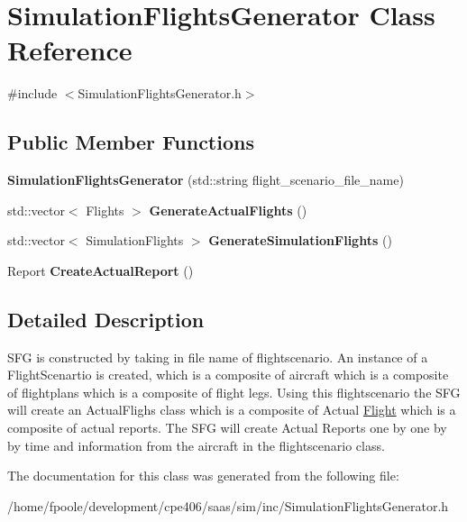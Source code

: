 \hypertarget{class_simulation_flights_generator}{}\section{Simulation\+Flights\+Generator Class Reference}
\label{class_simulation_flights_generator}


{\ttfamily \#include $<$Simulation\+Flights\+Generator.\+h$>$}

\subsection*{Public Member Functions}
\begin{DoxyCompactItemize}
\item 
\hypertarget{class_simulation_flights_generator_a16b4aac72f151322f19a2fa4e6551270}{}{\bfseries Simulation\+Flights\+Generator} (std\+::string flight\+\_\+scenario\+\_\+file\+\_\+name)\label{class_simulation_flights_generator_a16b4aac72f151322f19a2fa4e6551270}

\item 
\hypertarget{class_simulation_flights_generator_a9a0c16b0c69dfd3a409e4e066ac5df3b}{}std\+::vector$<$ Flights $>$ {\bfseries Generate\+Actual\+Flights} ()\label{class_simulation_flights_generator_a9a0c16b0c69dfd3a409e4e066ac5df3b}

\item 
\hypertarget{class_simulation_flights_generator_adf2866eb7b7b6d8b9834c1a78c82c51d}{}std\+::vector$<$ Simulation\+Flights $>$ {\bfseries Generate\+Simulation\+Flights} ()\label{class_simulation_flights_generator_adf2866eb7b7b6d8b9834c1a78c82c51d}

\item 
\hypertarget{class_simulation_flights_generator_acefe296dc90c9719cde9bf91be529105}{}Report {\bfseries Create\+Actual\+Report} ()\label{class_simulation_flights_generator_acefe296dc90c9719cde9bf91be529105}

\end{DoxyCompactItemize}


\subsection{Detailed Description}
S\+F\+G is constructed by taking in file name of flightscenario. An instance of a Flight\+Scenartio is created, which is a composite of aircraft which is a composite of flightplans which is a composite of flight legs. Using this flightscenario the S\+F\+G will create an Actual\+Flighs class which is a composite of Actual \hyperlink{class_flight}{Flight} which is a composite of actual reports. The S\+F\+G will create Actual Reports one by one by by time and information from the aircraft in the flightscenario class. 

The documentation for this class was generated from the following file\+:\begin{DoxyCompactItemize}
\item 
/home/fpoole/development/cpe406/saas/sim/inc/Simulation\+Flights\+Generator.\+h\end{DoxyCompactItemize}
